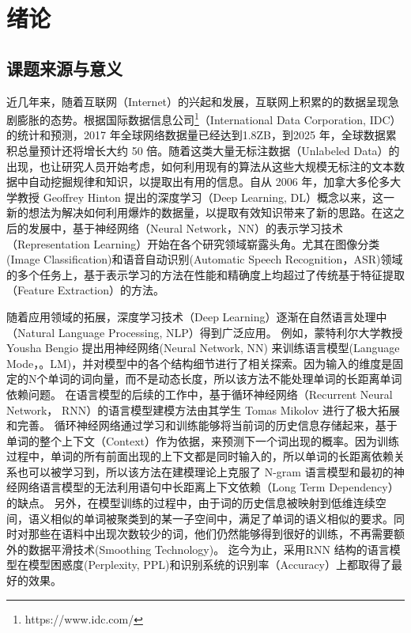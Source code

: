 \chapter{绪论}
\section{课题来源与意义}
近几年来，随着互联网（Internet）的兴起和发展，互联网上积累的的数据呈现急剧膨胀的态势。根据国际数据信息公司\footnote{https://www.idc.com/}（International Data Corporation, IDC）的统计和预测，2017 年全球网络数据量已经达到1.8ZB，到2025 年，全球数据累积总量预计还将增长大约 50 倍。随着这类大量无标注数据（Unlabeled Data）的出现，也让研究人员开始考虑，如何利用现有的算法从这些大规模无标注的文本数据中自动挖掘规律和知识，以提取出有用的信息。自从 2006 年，加拿大多伦多大学教授 Geoffrey Hinton 提出的深度学习（Deep Learning, DL）概念以来，这一新的想法为解决如何利用爆炸的数据量，以提取有效知识带来了新的思路。在这之后的发展中，基于神经网络（Neural Network，NN）的表示学习技术（Representation Learning）开始在各个研究领域崭露头角。尤其在图像分类(Image Classification)和语音自动识别(Automatic Speech Recognition，ASR)领域的多个任务上，基于表示学习的方法在性能和精确度上均超过了传统基于特征提取（Feature Extraction）的方法。

随着应用领域的拓展，深度学习技术（Deep Learning）逐渐在自然语言处理中（Natural Language Processing, NLP）得到广泛应用。 例如，蒙特利尔大学教授 Yousha Bengio 提出用神经网络(Neural Network, NN) 来训练语言模型(Language Mode，。LM)，并对模型中的各个结构细节进行了相关探索。因为输入的维度是固定的N个单词的词向量，而不是动态长度，所以该方法不能处理单词的长距离单词依赖问题。
在语言模型的后续的工作中，基于循环神经网络（Recurrent Neural Network， RNN）的语言模型建模方法由其学生 Tomas Mikolov 进行了极大拓展和完善。 循环神经网络通过学习和训练能够将当前词的历史信息存储起来，基于单词的整个上下文（Context）作为依据，来预测下一个词出现的概率。因为训练过程中，单词的所有前面出现的上下文都是同时输入的，所以单词的长距离依赖关系也可以被学习到，所以该方法在建模理论上克服了 N-gram 语言模型和最初的神经网络语言模型的无法利用语句中长距离上下文依赖（Long Term Dependency）的缺点。 另外，在模型训练的过程中，由于词的历史信息被映射到低维连续空间，语义相似的单词被聚类到的某一子空间中，满足了单词的语义相似的要求。同时对那些在语料中出现次数较少的词，他们仍然能够得到很好的训练，不再需要额外的数据平滑技术(Smoothing Technology)。
迄今为止，采用RNN 结构的语言模型在模型困惑度(Perplexity, PPL)和识别系统的识别率（Accuracy）上都取得了最好的效果。

